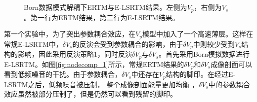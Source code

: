 \begin{figure}[!htb]
   \centering
   \\
   \\
   \caption{Born数据模式解耦下ERTM与E-LSRTM结果。左侧为$V_p$，右侧为$V_s$。第一行为ERTM结果，第二行为E-LSRTM结果。}
   \label{fig:decomp_1}
\end{figure}

第一个实验中，为了突出参数耦合效应，在$V_p$模型中加入了一个高速薄层。这样在常规E-LSRTM中，$\delta
V_s$的反演会受到参数耦合的影响，由于$\delta V_p$中则较少受到$V_s$结构的影响，因此采用反演策略1，同时反演$\delta
V_p$与$\delta
V_s$。首先采用Born模拟数据进行E-LSRTM。如图\ref{fig:nodecomp_1}所示，常规ERTM结果的$\delta
V_p$和$\delta V_s$成像剖面可以
看到低频噪音的干扰。由于参数耦合，$\delta
V_s$中还存在$V_p$结构的脚印。在经过E-LSRTM之后，低频噪音被压制，
整个成像剖面能量更加均衡
，$\delta V_s$中的参数耦合效应虽然被部分压制了，但是仍然可以看到残留的脚印。

